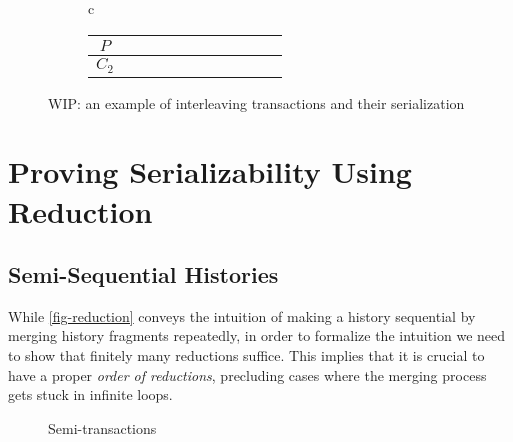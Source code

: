 \documentclass[sigplan,10pt,review,anonymous,screen]{acmart}\settopmatter{printfolios=true,printccs=false,printacmref=false}
\begin{document}
\begin{figure*}[t]
\begin{subfigure}[b]{0.6\textwidth}
\begin{tabular}{c}
\begin{tabular}{c|cccccccccc}
        \hline
        $P$ & & \rdcircf{$3$} & & \rdcircf{$5$} & & & \blcircf{$6$} & & \blcircf{$9$} & \\
        \hline
        $C_2$ & & & \rdcircf{$4$} & & & \blcircf{$2$} & & & & \blcircf{$10$} \\
        \hline
      \end{tabular}
    \end{tabular}
    \renewcommand{\arraystretch}{1.0}
  \end{subfigure}
  \caption{WIP: an example of interleaving transactions and their serialization }
  \label{fig-ex-interleaving}
\end{figure*}

\section{Proving Serializability Using Reduction}
\label{sec-appx-proof-sz}

\subsection{Semi-Sequential Histories}
\label{sec-appx-semi-sequential}

While \autoref{fig-reduction} conveys the intuition of making a history sequential by merging history fragments repeatedly, in order to formalize the intuition we need to show that finitely many reductions suffice.
This implies that it is crucial to have a proper \emph{order of reductions}, precluding cases where the merging process gets stuck in infinite loops.

\begin{figure}[h]
  \centering
  \caption{Semi-transactions}
  \label{fig-semi-trs}
\end{figure}
\end{document}
